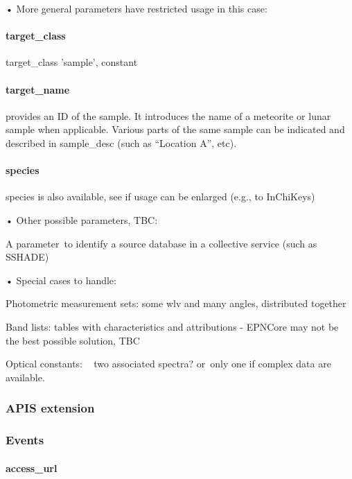 \documentclass[11pt,a4paper]{ivoa}
\begin{document}
• More general parameters have restricted usage in this case:

\paragraph{target\_class\textbf{ }}

target\_class 'sample', constant

\paragraph{target\_name}

provides an ID of the sample. It introduces the name of a meteorite or lunar sample when applicable. Various parts of the same sample can be indicated and described in sample\_desc (such as ``Location A'', etc).

\paragraph{species}

species is also available, see if usage can be enlarged (e.g., to InChiKeys)

• Other possible parameters, TBC:

A parameter to identify a source database in a collective service (such as SSHADE)

• Special cases to handle:

Photometric measurement sets: some wlv and many angles, distributed together

Band lists: tables with characteristics and attributions - EPNCore may not be the best possible solution, TBC

Optical constants: ~ two associated spectra? or only one if complex data are available.

\subsubsection{APIS extension\\}

\subsubsection{Events\\}

\paragraph{access\_url\textbf{ }}
\end{document}
